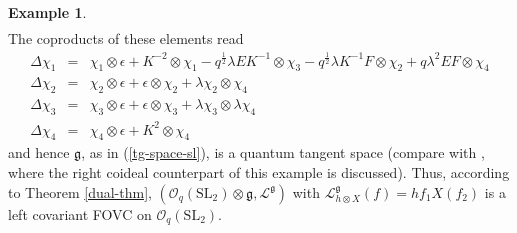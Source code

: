 \documentclass{article}
\theoremstyle{definition}
\newtheorem{example}[thm]{Example}
\newcommand{\cO}{{\mathcal{O}}}
\newcommand{\rSL}{{\mathrm{SL}}}
\newcommand{\fg}{{\mathfrak{g}}}
\begin{document}
\begin{example}
\begin{equation}
\begin{array}{rcl}
			\end{array}
		\end{equation}
		The coproducts of these elements read
		\begin{equation}\label{coaction-sl}
			\begin{array}{rcl}
				\Delta\chi_1&=&\chi_1\otimes \epsilon+K^{-2}\otimes \chi_1- q^{\frac 1 2}\lambda EK^{-1}\otimes \chi_3- q^{\frac 1 2}\lambda K^{-1}F\otimes \chi_2+q\lambda^2 EF   \otimes\chi_4 \\[3mm]
				\Delta \chi_2&=& \chi_2\otimes \epsilon+\epsilon\otimes \chi_2+\lambda\chi_2\otimes \chi_4 \\[3mm]
				\Delta \chi_3&=& \chi_3\otimes \epsilon+\epsilon\otimes \chi_3+\lambda\chi_3\otimes \lambda\chi_4 \\[3mm]
				\Delta \chi_4&=&\chi_4 \otimes  \epsilon +K^2\otimes \chi_4
			\end{array}
		\end{equation}
		and hence $\fg$, as in (\ref{tg-space-sl}), is a quantum tangent space (compare with \cite[Section 14.2.4]{ks}, where the right coideal counterpart of this example is discussed). Thus, according to Theorem \ref{dual-thm},
		$(\cO_q(\rSL_2)\otimes \mathfrak{g}, \mathscr{L}^{\mathfrak{g}})$
		with $\mathscr{L}^{\mathfrak{g}}_{h\otimes X}(f)= hf_{1}X(f_{2})$ is a left covariant FOVC on $\cO_q(\rSL_2)$.
		

\end{example}
\end{document}
